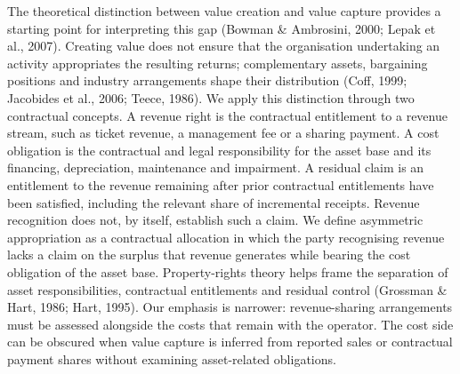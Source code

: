 \documentclass[review,3p,times]{elsarticle}
\begin{document}
The theoretical distinction between value creation and value capture provides a starting point for interpreting this gap (Bowman \& Ambrosini, 2000; Lepak et al., 2007). Creating value does not ensure that the organisation undertaking an activity appropriates the resulting returns; complementary assets, bargaining positions and industry arrangements shape their distribution (Coff, 1999; Jacobides et al., 2006; Teece, 1986). We apply this distinction through two contractual concepts. A revenue right is the contractual entitlement to a revenue stream, such as ticket revenue, a management fee or a sharing payment. A cost obligation is the contractual and legal responsibility for the asset base and its financing, depreciation, maintenance and impairment. A residual claim is an entitlement to the revenue remaining after prior contractual entitlements have been satisfied, including the relevant share of incremental receipts. Revenue recognition does not, by itself, establish such a claim. We define asymmetric appropriation as a contractual allocation in which the party recognising revenue lacks a claim on the surplus that revenue generates while bearing the cost obligation of the asset base. Property-rights theory helps frame the separation of asset responsibilities, contractual entitlements and residual control (Grossman \& Hart, 1986; Hart, 1995). Our emphasis is narrower: revenue-sharing arrangements must be assessed alongside the costs that remain with the operator. The cost side can be obscured when value capture is inferred from reported sales or contractual payment shares without examining asset-related obligations.
\end{document}
